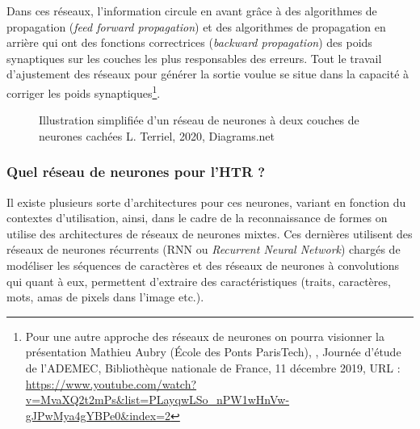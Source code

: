 Dans ces réseaux, l'information circule en avant grâce à des algorithmes de propagation (\textit{feed forward propagation}) et des algorithmes de propagation en arrière qui ont des fonctions correctrices (\textit{backward propagation}) des poids synaptiques sur les couches les plus responsables des erreurs. Tout le travail d'ajustement des réseaux pour générer la sortie voulue se situe dans la capacité à corriger les poids synaptiques\footnote{Pour une autre approche des réseaux de neurones on pourra visionner la présentation Mathieu Aubry (École des Ponts ParisTech), , Journée d'étude  de l'ADEMEC, Bibliothèque nationale de France, 11 décembre 2019, URL : \url{https://www.youtube.com/watch?v=MvaXQ2t2mPs&list=PLayqwLSo_nPW1wHnVw-gJPwMya4gYBPe0&index=2}}.

\newpage
\begin{figure}[h]
    \centering
    \centerline{}
    \caption{Illustration simplifiée d'un réseau de neurones à deux couches de neurones cachées   \textcopyright L. Terriel, 2020, Diagrams.net}
    \label{fig:graph_neurones_artificiels}
\end{figure}

\subsubsection{Quel réseau de neurones pour l'HTR ?}     

Il existe plusieurs sorte d'architectures pour ces neurones, variant en fonction du contextes d'utilisation, ainsi, dans le cadre de la reconnaissance de formes on utilise des architectures de réseaux de neurones mixtes. Ces dernières utilisent des réseaux de neurones récurrents (RNN ou \textit{Recurrent Neural Network}) chargés de modéliser les séquences de caractères et des réseaux de neurones à convolutions qui quant à eux, permettent d'extraire des caractéristiques (traits, caractères, mots, amas de pixels dans l'image etc.). 

